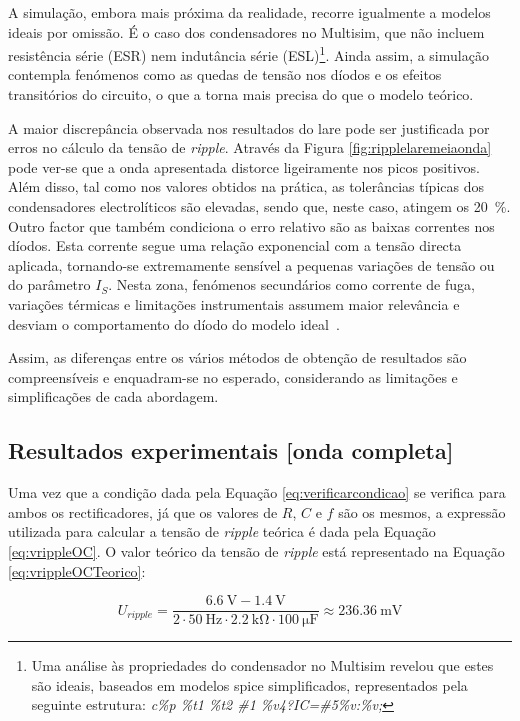 A simulação, embora mais próxima da realidade, recorre igualmente a modelos ideais por omissão. É o caso dos condensadores no Multisim, que não incluem resistência série (ESR) nem indutância série (ESL)\footnote{Uma análise às propriedades do condensador no Multisim revelou que estes são ideais, baseados em modelos \acrshort{spice} simplificados, representados pela seguinte estrutura: \textit{c\%p \%t1 \%t2 \#1 \%v4?IC=\#5\%v:\%v;}}. Ainda assim, a simulação contempla fenómenos como as quedas de tensão nos díodos e os efeitos transitórios do circuito, o que a torna mais precisa do que o modelo teórico.

A maior discrepância observada nos resultados do \acrshort{lare} pode ser justificada por erros no cálculo da tensão de \textit{ripple}. Através da Figura \ref{fig:ripplelaremeiaonda} pode ver-se que a onda apresentada distorce ligeiramente nos picos positivos. Além disso, tal como nos valores obtidos na prática, as tolerâncias típicas dos condensadores electrolíticos são elevadas, sendo que, neste caso, atingem os \SI{20}{\percent}\cite{toleranciacondensadores}. Outro factor que também condiciona o erro relativo são as baixas correntes nos díodos. Esta corrente segue uma relação exponencial com a tensão directa aplicada, tornando-se extremamente sensível a pequenas variações de tensão ou do parâmetro $I_{S}$. Nesta zona, fenómenos secundários como corrente de fuga, variações térmicas e limitações instrumentais assumem maior relevância e desviam o comportamento do díodo do modelo ideal~\cite{sedrasmith}.

Assim, as diferenças entre os vários métodos de obtenção de resultados são compreensíveis e enquadram-se no esperado, considerando as limitações e simplificações de cada abordagem.

\subsection{Resultados experimentais [onda completa]}
\label{sec:resultados_RectificadoresOndacompleta}
Uma vez que a condição dada pela Equação \ref{eq:verificarcondicao} se verifica para ambos os rectificadores, já que os valores de $R$, $C$ e $f$ são os mesmos, a expressão utilizada para calcular a tensão de \textit{ripple} teórica é dada pela Equação \ref{eq:vrippleOC}. O valor teórico da tensão de \textit{ripple} está representado na Equação \ref{eq:vrippleOCTeorico}:

\begin{equation} \label{eq:vrippleOCTeorico}
	U_{ripple} = \frac{\SI{6.6}{\volt} - \SI{1.4}{\volt}}{2\cdot\SI{50}{\hertz}\cdot\SI{2.2}{\kilo\ohm}\cdot\SI{100}{\micro\farad}} \approx \SI{236.36}{\milli\volt}
\end{equation}


